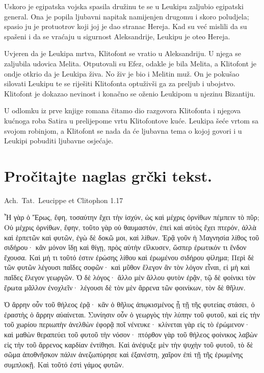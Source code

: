 Uskoro je egipatska vojska spasila družinu te se u Leukipu zaljubio egipatski general. Ona je popila ljubavni napitak namijenjen drugomu i skoro poludjela; spasio ju je protuotrov koji joj je dao stranac Hereja. Kad su već mislili da su spašeni i da se vraćaju u sigurnost Aleksandrije, Leukipu je oteo Hereja.

Uvjeren da je Leukipa mrtva, Klitofont se vratio u Aleksandriju. U njega se zaljubila udovica Melita. Otputovali su Efez, odakle je bila Melita, a Klitofont je ondje otkrio da je Leukipa živa. No živ je bio i Melitin muž. On je pokušao silovati Leukipu te se riješiti Klitofonta optuživši ga za preljub i ubojstvo. Klitofont je dokazao nevinost i konačno se oženio Leukipom u njezinu Bizantiju. 

U odlomku iz prve knjige romana čitamo dio razgovora Klitofonta i njegova kućnoga roba Satira u prelijepome vrtu Klitofontove kuće. Leukipa šeće vrtom sa svojom robinjom, a Klitofont se nada da će ljubavna tema o kojoj govori i u Leukipi pobuditi ljubavne osjećaje.


\newpage

\section*{Pročitajte naglas grčki tekst.}

Ach.~Tat.\ Leucippe et Clitophon 1.17


\medskip


{\large

\begin{greek}

\noindent Ἦ γὰρ ὁ Ἔρως, ἔφη, τοσαύτην ἔχει τὴν ἰσχύν, ὡς καὶ μέχρις ὀρνίθων πέμπειν τὸ πῦρ; Οὐ μέχρις ὀρνίθων, ἔφην, τοῦτο γὰρ οὐ θαυμαστόν, ἐπεὶ καὶ αὐτὸς ἔχει πτερόν, ἀλλὰ καὶ ἑρπετῶν καὶ φυτῶν, ἐγὼ δὲ δοκῶ μοι, καὶ λίθων. Ἐρᾷ γοῦν ἡ Μαγνησία λίθος τοῦ σιδήρου· κἂν μόνον ἴδῃ καὶ θίγῃ, πρὸς αὑτὴν εἵλκυσεν, ὥσπερ ἐρωτικόν τι ἔνδον ἔχουσα. Καὶ μή τι τοῦτό ἐστιν ἐρώσης λίθου καὶ ἐρωμένου σιδήρου φίλημα; Περὶ δὲ τῶν φυτῶν λέγουσι παῖδες σοφῶν· καὶ μῦθον ἔλεγον ἂν τὸν λόγον εἶναι, εἰ μὴ καὶ παῖδες ἔλεγον γεωργῶν. Ὁ δὲ λόγος· ἄλλο μὲν ἄλλου φυτὸν ἐρᾷν, τῷ δὲ φοίνικι τὸν ἔρωτα μᾶλλον ἐνοχλεῖν· λέγουσι δὲ τὸν μὲν ἄρρενα τῶν φοινίκων, τὸν δὲ θῆλυν.

\noindent Ὁ ἄρρην οὖν τοῦ θήλεος ἐρᾷ· κἂν ὁ θῆλυς ἀπῳκισμένος ᾖ τῇ τῆς φυτείας στάσει, ὁ ἐραστὴς ὁ ἄρρην αὐαίνεται. Συνίησιν οὖν ὁ γεωργὸς τὴν λύπην τοῦ φυτοῦ, καὶ εἰς τὴν τοῦ χωρίου περιωπὴν ἀνελθὼν ἐφορᾷ ποῖ νένευκε· κλίνεται γὰρ εἰς τὸ ἐρώμενον· καὶ μαθὼν θεραπεύει τοῦ φυτοῦ τὴν νόσον· πτόρθον γὰρ τοῦ θήλεος φοίνικος λαβὼν εἰς τὴν τοῦ ἄρρενος καρδίαν ἐντίθησι. Καὶ ἀνέψυξε μὲν τὴν ψυχὴν τοῦ φυτοῦ, τὸ δὲ σῶμα ἀποθνῆσκον πάλιν ἀνεζωπύρησε καὶ ἐξανέστη, χαῖρον ἐπὶ τῇ τῆς ἐρωμένης  συμπλοκῇ. Καὶ τοῦτό ἐστὶ γάμος φυτῶν.

\end{greek}

}


